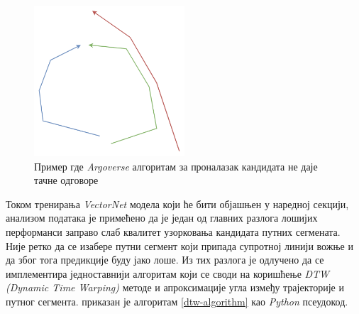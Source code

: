 \documentclass[11pt,oneside]{memoir}
\begin{document}
\begin{figure}[H]
  \centering
  \includegraphics[width=0.5\textwidth]{images/argoverse-clcand-flaws.drawio.png}
  \caption{Пример где \textit{Argoverse} алгоритам за проналазак кандидата не даје тачне одговоре}
  \label{argoverse-clcand-flaws}
\end{figure}

Током тренирања \textit{VectorNet} модела који ће бити објашњен у наредној секцији, анализом података је примећено да је један од главних
разлога лошијих перформанси заправо слаб квалитет узорковања кандидата путних сегмената. Није ретко да се изабере путни сегмент који припада
супротној линији вожње и да због тога предикције буду јако лоше. Из тих разлога је одлучено да се имплементира једноставнији алгоритам
који се своди на коришћење \textit{DTW (Dynamic Time Warping)} методе и апроксимације угла између трајекторије и путног сегмента. приказан
је алгоритам \ref{dtw-algorithm} као \textit{Python} псеудокод.
\end{document}
